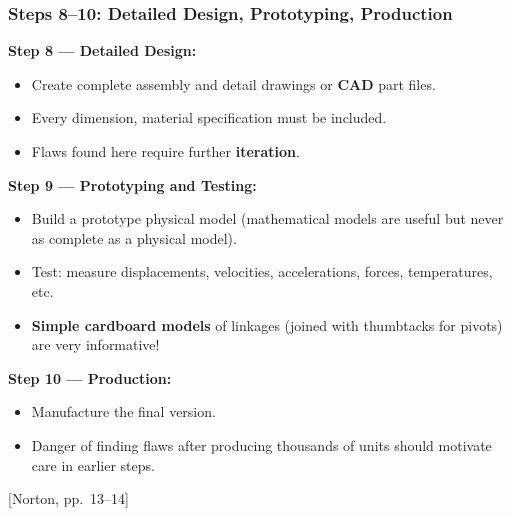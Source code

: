 \documentclass[10pt,aspectratio=43]{beamer}
\newcommand{\pref}[1]{\vfill\hfill{\scriptsize\color{gray}[Norton, pp.~#1]}}
\begin{document}
\begin{frame}
\frametitle{Steps 8--10: Detailed Design, Prototyping, Production}

\textbf{Step 8 --- Detailed Design:}
\begin{itemize}
  \item Create complete assembly and detail drawings or \textbf{CAD} part files.
  \item Every dimension, material specification must be included.
  \item Flaws found here require further \textbf{iteration}.
\end{itemize}

\vspace{6pt}
\textbf{Step 9 --- Prototyping and Testing:}
\begin{itemize}
  \item Build a prototype physical model (mathematical models are useful but never as complete as a physical model).
  \item Test: measure displacements, velocities, accelerations, forces, temperatures, etc.
  \item \textbf{Simple cardboard models} of linkages (joined with thumbtacks for pivots) are very informative!
\end{itemize}

\vspace{6pt}
\textbf{Step 10 --- Production:}
\begin{itemize}
  \item Manufacture the final version.
  \item Danger of finding flaws after producing thousands of units should motivate care in earlier steps.
\end{itemize}
\pref{13--14}
\end{frame}
\end{document}
